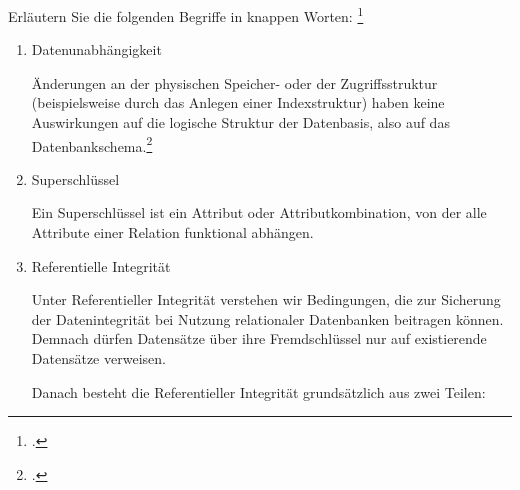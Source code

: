 \documentclass{bschlangaul-aufgabe}
\begin{document}

Erläutern Sie die folgenden Begriffe in knappen Worten:
\footcite[Aufgabe 12: (Begriffe definieren)]{db:ab:7}

\begin{enumerate}


\item Datenunabhängigkeit

\begin{bAntwort}
Änderungen an der physischen Speicher- oder der Zugriffsstruktur
(beispielsweise durch das Anlegen einer Indexstruktur) haben keine
Auswirkungen auf die logische Struktur der Datenbasis, also auf das
Datenbankschema.\footcite{examen:46116:2015:09}
\end{bAntwort}


\item Superschlüssel

\begin{bAntwort}
Ein Superschlüssel ist ein Attribut oder Attributkombination, von der
alle Attribute einer Relation funktional abhängen.
\end{bAntwort}


\item Referentielle Integrität

\begin{bAntwort}
Unter Referentieller Integrität verstehen wir Bedingungen, die zur
Sicherung der Datenintegrität bei Nutzung relationaler Datenbanken
beitragen können. Demnach dürfen Datensätze über ihre
Fremdschlüssel nur auf existierende Datensätze verweisen.

Danach besteht die Referentieller Integrität grundsätzlich aus zwei
Teilen:

\begin{enumerate}


\end{enumerate}
\end{bAntwort}
\end{enumerate}
\end{document}
